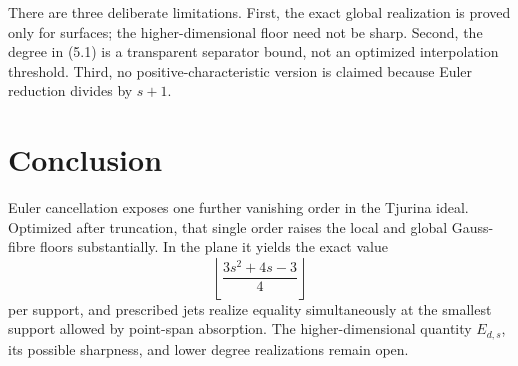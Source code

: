 \documentclass[11pt,a4paper]{article}
\theoremstyle{definition}
\numberwithin{equation}{section}
\begin{document}
There are three deliberate limitations.  First, the exact global
realization is proved only for surfaces; the higher-dimensional floor
need not be sharp.  Second, the degree in (5.1) is a transparent separator
bound, not an optimized interpolation threshold.  Third, no
positive-characteristic version is claimed because Euler reduction divides
by \(s+1\).

\section{Conclusion}

Euler cancellation exposes one further vanishing order in the Tjurina
ideal.  Optimized after truncation, that single order raises the local and
global Gauss-fibre floors substantially.  In the plane it yields the exact
value
\[
 \left\lfloor\frac{3s^2+4s-3}{4}\right\rfloor
\]
per support, and prescribed jets realize equality simultaneously at the
smallest support allowed by point-span absorption.  The higher-dimensional
quantity \(E_{d,s}\), its possible sharpness, and lower degree realizations
remain open.
\end{document}
